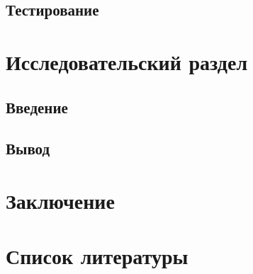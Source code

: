 \subsection{Тестирование}

\section{Исследовательский раздел}
\subsection{Введение}

\subsection{Вывод}

\section{Заключение}

\section{Список литературы}
\nocite{datasetList, rgbdBenchmark, msds}
\printbibliography[heading=none]


